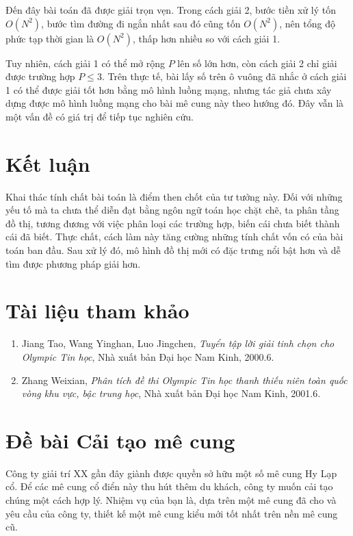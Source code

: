 \documentclass[11pt]{article}
\begin{document}
Đến đây bài toán đã được giải trọn vẹn. Trong cách giải 2, bước tiền xử lý
tốn $O(N^2)$, bước tìm đường đi ngắn nhất sau đó cũng tốn $O(N^2)$, nên tổng
độ phức tạp thời gian là $O(N^2)$, thấp hơn nhiều so với cách giải 1.

Tuy nhiên, cách giải 1 có thể mở rộng $P$ lên số lớn hơn, còn cách giải 2 chỉ
giải được trường hợp $P\le 3$. Trên thực tế, bài lấy số trên ô vuông đã nhắc
ở cách giải 1 có thể được giải tốt hơn bằng mô hình luồng mạng, nhưng tác giả
chưa xây dựng được mô hình luồng mạng cho bài mê cung này theo hướng đó. Đây
vẫn là một vấn đề có giá trị để tiếp tục nghiên cứu.

\section{Kết luận}

Khai thác tính chất bài toán là điểm then chốt của tư tưởng này. Đối với
những yếu tố mà ta chưa thể diễn đạt bằng ngôn ngữ toán học chặt chẽ, ta phân
tầng đồ thị, tương đương với việc phân loại các trường hợp, biến cái chưa
biết thành cái đã biết. Thực chất, cách làm này tăng cường những tính chất
vốn có của bài toán ban đầu. Sau xử lý đó, mô hình đồ thị mới có đặc trưng
nổi bật hơn và dễ tìm được phương pháp giải hơn.

\section*{Tài liệu tham khảo}

\begin{enumerate}
  \item Jiang Tao, Wang Yinghan, Luo Jingchen, \textit{Tuyển tập lời giải
  tinh chọn cho Olympic Tin học}, Nhà xuất bản Đại học Nam Kinh, 2000.6.
  \item Zhang Weixian, \textit{Phân tích đề thi Olympic Tin học thanh thiếu
  niên toàn quốc vòng khu vực, bậc trung học}, Nhà xuất bản Đại học Nam Kinh,
  2001.6.
\end{enumerate}

\appendix
\section{Đề bài Cải tạo mê cung}

Công ty giải trí XX gần đây giành được quyền sở hữu một số mê cung Hy Lạp cổ.
Để các mê cung cổ điển này thu hút thêm du khách, công ty muốn cải tạo chúng
một cách hợp lý. Nhiệm vụ của bạn là, dựa trên một mê cung đã cho và yêu cầu
của công ty, thiết kế một mê cung kiểu mới tốt nhất trên nền mê cung cũ.
\end{document}
